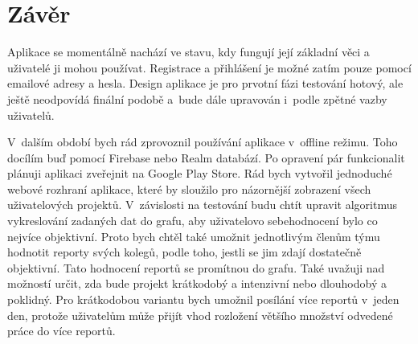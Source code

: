 \chapter{Závěr}

Aplikace se momentálně nachází ve stavu, kdy fungují její základní věci a uživatelé ji mohou používat. Registrace a přihlášení je možné zatím pouze pomocí emailové adresy a hesla. Design aplikace je pro prvotní fázi testování hotový, ale ještě neodpovídá finální podobě a~bude dále upravován i~podle zpětné vazby uživatelů. 

V~dalším období bych rád zprovoznil používání aplikace v~offline režimu. Toho docílím buď pomocí Firebase nebo Realm databází. Po opravení pár funkcionalit plánuji aplikaci zveřejnit na Google Play Store. Rád bych vytvořil jednoduché webové rozhraní aplikace, které by sloužilo pro názornější zobrazení všech uživatelových projektů. V~závislosti na testování budu chtít upravit algoritmus vykreslování zadaných dat do grafu, aby uživatelovo sebehodnocení bylo co nejvíce objektivní. Proto bych chtěl také umožnit jednotlivým členům týmu hodnotit reporty svých kolegů, podle toho, jestli se jim zdají dostatečně objektivní. Tato hodnocení reportů se promítnou do grafu. Také uvažuji nad možností určit, zda bude projekt krátkodobý a intenzivní nebo dlouhodobý a poklidný. Pro krátkodobou variantu bych umožnil posílání více reportů v~jeden den, protože uživatelům může přijít vhod rozložení většího množství odvedené práce do více reportů.  

